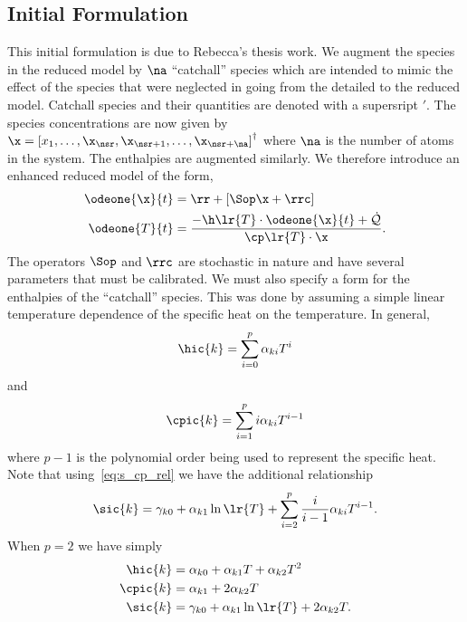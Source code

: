 \subsection{Initial Formulation}
This initial formulation is due to Rebecca's thesis work.  We augment the species in the 
reduced model by $\na$ ``catchall'' species which are intended to mimic the effect of the 
species that were neglected in going from the detailed to the reduced model.  Catchall 
species and their quantities are denoted with a supersript $\prime$.  The species 
concentrations are now given by 
$\x = \left[x_{1}, \ldots, \x_{\nsr}, \x_{\nsr+1}, \ldots, \x_{\nsr + \na}\right]^{\dagger}$ 
where $\na$ is the number of atoms in the system.  The enthalpies are augmented similarly.  
We therefore introduce an enhanced reduced model of the form,
\begin{align}
  \odeone{\x}{t} &= \rr + \left[\Sop \x + \rrc\right] \label{eq:inad_reb} \\
  \odeone{T}{t}  &= \frac{-\displaystyle \h\lr{T}\cdot\odeone{\x}{t} + \dot{\mathcal{Q}}}
                         {\displaystyle \cp\lr{T}\cdot\x}. \label{eq:energy_reb}
\end{align}
The operators $\Sop$ and $\rrc$ are stochastic in nature and have several parameters that 
must be calibrated.  We must also specify a form for the enthalpies of the ``catchall'' 
species.  This was done by assuming a simple linear temperature dependence of the specific 
heat on the temperature.  In general,  
\begin{align}
  \hic{k} = \sum_{i=0}^{p}{\alpha_{ki}T^{i}}
\end{align}
and 
\begin{align}
  \cpic{k} = \sum_{i=1}^{p}{i\alpha_{ki}T^{i-1}}
\end{align}
where $p-1$ is the polynomial order being used to represent the specific heat.  Note that 
using~\eqref{eq:s_cp_rel} we have the additional relationship 
\begin{align}
  \sic{k} = \gamma_{k0} + \alpha_{k1}\ln\lr{T} + \sum_{i=2}^{p}{\frac{i}{i-1}\alpha_{ki}T^{i-1}}.
\end{align}
When $p=2$ we have simply 
\begin{align}
  \hic{k}  &= \alpha_{k0} + \alpha_{k1}T + \alpha_{k2}T^{2} \\ 
  \cpic{k} &= \alpha_{k1} + 2\alpha_{k2}T \\
  \sic{k}  &= \gamma_{k0}  + \alpha_{k1}\ln\lr{T} + 2\alpha_{k2}T.
\end{align}

